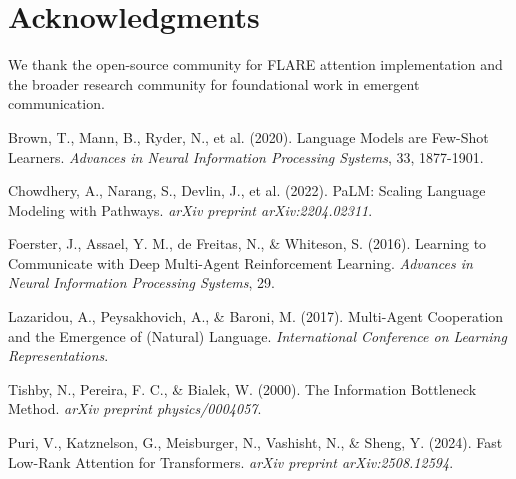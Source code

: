 \documentclass[10pt,twocolumn]{article}
\begin{document}
\section*{Acknowledgments}

We thank the open-source community for FLARE attention implementation and the broader research community for foundational work in emergent communication.


\begin{thebibliography}{99}

Brown, T., Mann, B., Ryder, N., et al. (2020). Language Models are Few-Shot Learners. \textit{Advances in Neural Information Processing Systems}, 33, 1877-1901.

Chowdhery, A., Narang, S., Devlin, J., et al. (2022). PaLM: Scaling Language Modeling with Pathways. \textit{arXiv preprint arXiv:2204.02311}.

Foerster, J., Assael, Y. M., de Freitas, N., \& Whiteson, S. (2016). Learning to Communicate with Deep Multi-Agent Reinforcement Learning. \textit{Advances in Neural Information Processing Systems}, 29.

Lazaridou, A., Peysakhovich, A., \& Baroni, M. (2017). Multi-Agent Cooperation and the Emergence of (Natural) Language. \textit{International Conference on Learning Representations}.

Tishby, N., Pereira, F. C., \& Bialek, W. (2000). The Information Bottleneck Method. \textit{arXiv preprint physics/0004057}.

Puri, V., Katznelson, G., Meisburger, N., Vashisht, N., \& Sheng, Y. (2024). Fast Low-Rank Attention for Transformers. \textit{arXiv preprint arXiv:2508.12594}.

\end{thebibliography}
\end{document}
